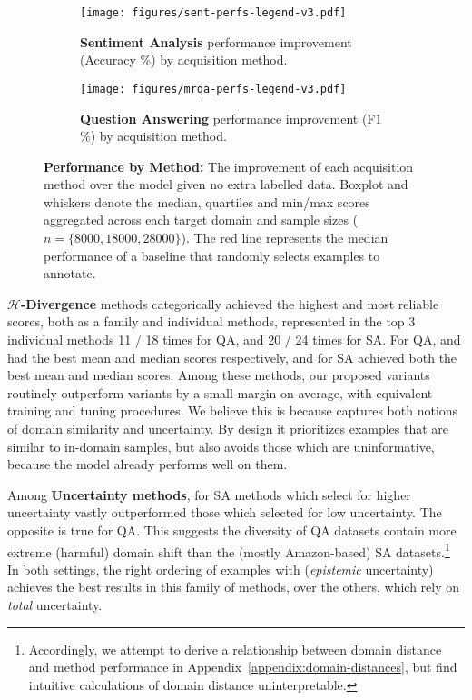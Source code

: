 \begin{figure*}
    \vspace*{-.6cm}
        \centering
        \begin{subfigure}{.83\textwidth}
          \texttt{[image: figures/sent-perfs-legend-v3.pdf]}
          \caption{\label{fig:sent-performances}
          \small \textbf{Sentiment Analysis} performance improvement (Accuracy \%) by acquisition method.}
        \end{subfigure}
        
        \begin{subfigure}{.83\textwidth}
          \texttt{[image: figures/mrqa-perfs-legend-v3.pdf]}
          \caption{\small \textbf{Question Answering} performance improvement (F1 \%) by acquisition method.}
          \label{fig:mrqa-performances}
        \end{subfigure}
        
        \caption{\textbf{Performance by Method:} The improvement of each acquisition method over the model given no extra labelled data.
        Boxplot and whiskers denote the median, quartiles and min/max scores aggregated across each target domain and sample sizes ($n=\{8000, 18000, 28000\}$).
        The \textcolor{myred}{red} line represents the median performance of a baseline that randomly selects examples to annotate.
        }
    \label{fig:performances}
    \vspace*{-.7cm}
    \end{figure*}
    
    \textbf{$\mathcal{H}$-Divergence} methods categorically achieved the highest and most reliable scores, both as a family and individual methods, represented in the top 3 individual methods 11 / 18 times for QA, and 20 / 24 times for SA.
    For QA, \balda{} and \dales{} had the best mean and median scores respectively, and for SA \dale{} achieved both the best mean and median scores. 
    Among these methods, our proposed \dale{} variants routinely outperform \dalt{} variants by a small margin on average, with equivalent training and tuning procedures.
    We believe this is because \dale{} captures both notions of domain similarity and uncertainty. 
    By design it prioritizes examples that are similar to in-domain samples, but also avoids those which are uninformative, because the model already performs well on them. 
    
    Among \textbf{Uncertainty methods}, for SA methods which select for higher uncertainty vastly outperformed those which selected for low uncertainty.
    The opposite is true for QA.
    This suggests the diversity of QA datasets contain more extreme (harmful) domain shift than the (mostly Amazon-based) SA datasets.\footnote{Accordingly, we attempt to derive a relationship between domain distance and method performance in Appendix~\ref{appendix:domain-distances}, but find intuitive calculations of domain distance uninterpretable.}
    In both settings, the right ordering of examples with \bald{} (\emph{epistemic} uncertainty) achieves the best results in this family of methods, over the others, which rely on \emph{total} uncertainty.
    
